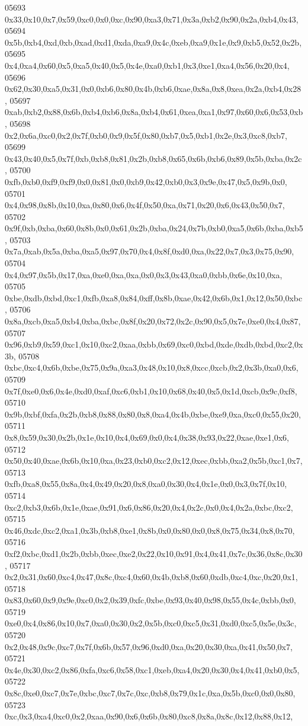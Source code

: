 \begin{DoxyCode}
05693   0x33,0x10,0x7,0x59,0xc0,0x0,0xc,0x90,0xa3,0x71,0x3a,0xb2,0x90,0x2a,0xb4,0x43,
05694   0x5b,0xb4,0xd,0xb,0xad,0xd1,0xda,0xa9,0x4c,0xeb,0xa9,0x1e,0x9,0xb5,0x52,0x2b,
05695   0x4,0xa4,0x60,0x5,0xa5,0x40,0x5,0x4e,0xa0,0xb1,0x3,0xe1,0xa4,0x56,0x20,0x4,
05696   0x62,0x30,0xa5,0x31,0x0,0xb6,0x80,0x4b,0xb6,0xae,0x8a,0x8,0xea,0x2a,0xb4,0x28,
05697   0xab,0xb2,0x88,0x6b,0xb4,0xb6,0x8a,0xb4,0x61,0xea,0xa1,0x97,0x60,0x6,0x53,0xb,
05698   0x2,0x6a,0xc0,0x2,0x7f,0xb0,0x9,0x5f,0x80,0xb7,0x5,0xb1,0x2e,0x3,0xc8,0xb7,
05699   0x43,0x40,0x5,0x7f,0xb,0xb8,0x81,0x2b,0xb8,0x65,0x6b,0xb6,0x89,0x5b,0xba,0x2c,
05700   0xfb,0xb0,0xf9,0xf9,0x0,0x81,0x0,0xb9,0x42,0xb0,0x3,0x9e,0x47,0x5,0x9b,0x0,
05701   0x4,0x98,0x8b,0x10,0xa,0x80,0x6,0x4f,0x50,0xa,0x71,0x20,0x6,0x43,0x50,0x7,
05702   0x9f,0xb,0xba,0x60,0x8b,0x0,0x61,0x2b,0xba,0x24,0x7b,0xb0,0xa5,0x6b,0xba,0xb5,
05703   0x7a,0xab,0x5a,0xba,0xa5,0x97,0x70,0x4,0x8f,0xd0,0xa,0x22,0x7,0x3,0x75,0x90,
05704   0x4,0x97,0x5b,0x17,0xa,0xe0,0xa,0xa,0x0,0x3,0x43,0xa0,0xbb,0x6e,0x10,0xa,
05705   0xbe,0xdb,0xbd,0xc1,0xfb,0xa8,0x84,0xff,0x8b,0xae,0x42,0x6b,0x1,0x12,0x50,0xbc,
05706   0x8a,0xcb,0xa5,0xb4,0xba,0xbc,0x8f,0x20,0x72,0x2c,0x90,0x5,0x7e,0xe0,0x4,0x87,
05707   0x96,0xb9,0x59,0xc1,0x10,0xc2,0xaa,0xbb,0x69,0xc0,0xbd,0xde,0xdb,0xbd,0xc2,0x3b,
05708   0xbc,0xc4,0x6b,0xbe,0x75,0x9a,0xa3,0x48,0x10,0x8,0xcc,0xcb,0x2,0x3b,0xa0,0x6,
05709   0x7f,0xe0,0x6,0x4e,0xd0,0xaf,0xc6,0xb1,0x10,0x68,0x40,0x5,0x1d,0xcb,0x9c,0xf8,
05710   0x9b,0xbf,0xfa,0x2b,0xb8,0x88,0x80,0x8,0xa4,0x4b,0xbe,0xe9,0xa,0xc0,0x55,0x20,
05711   0x8,0x59,0x30,0x2b,0x1e,0x10,0x4,0x69,0x0,0x4,0x38,0x93,0x22,0xae,0xe1,0x6,
05712   0x50,0x40,0xae,0x6b,0x10,0xa,0x23,0xb0,0xc2,0x12,0xec,0xbb,0xa2,0x5b,0xc1,0x7,
05713   0xfb,0xa8,0x55,0x8a,0x4,0x49,0x20,0x8,0xa0,0x30,0x4,0x1e,0x0,0x3,0x7f,0x10,
05714   0xc2,0xb3,0x6b,0x1e,0xae,0x91,0x6,0x86,0x20,0x4,0x2c,0x0,0x4,0x2a,0xbc,0xc2,
05715   0x46,0xdc,0xc2,0xa1,0x3b,0xb8,0xe1,0x8b,0x0,0x80,0x0,0x8,0x75,0x34,0x8,0x70,
05716   0xf2,0xbc,0xd1,0x2b,0xbb,0xec,0xe2,0x22,0x10,0x91,0x4,0x41,0x7c,0x36,0x8c,0x30,
05717   0x2,0x31,0x60,0xc4,0x47,0x8c,0xc4,0x60,0x4b,0xb8,0x60,0xdb,0xc4,0xc,0x20,0x1,
05718   0x83,0x60,0x9,0x9e,0xc0,0x2,0x39,0xfc,0xbe,0x93,0x40,0x98,0x55,0x4c,0xbb,0x0,
05719   0xe0,0x4,0x86,0x10,0x7,0xa0,0x30,0x2,0x5b,0xc0,0xc5,0x31,0xd0,0xc5,0x5e,0x3c,
05720   0x2,0x48,0x9c,0xc7,0x7f,0x6b,0x57,0x96,0xd0,0xa,0x20,0x30,0xa,0x41,0x50,0x7,
05721   0x4e,0x30,0xc2,0x86,0xfa,0xc6,0x58,0xc1,0xeb,0xa4,0x20,0x30,0x4,0x41,0xb0,0x5,
05722   0x8c,0xe0,0xc7,0x7e,0xbc,0xc7,0x7c,0xc,0xb8,0x79,0x1c,0xa,0x5b,0xc0,0x0,0x80,
05723   0xc,0x3,0xa4,0xc0,0x2,0xaa,0x90,0x6,0x6b,0x80,0xc8,0x8a,0x8c,0x12,0x88,0x12,

\end{DoxyCode}

